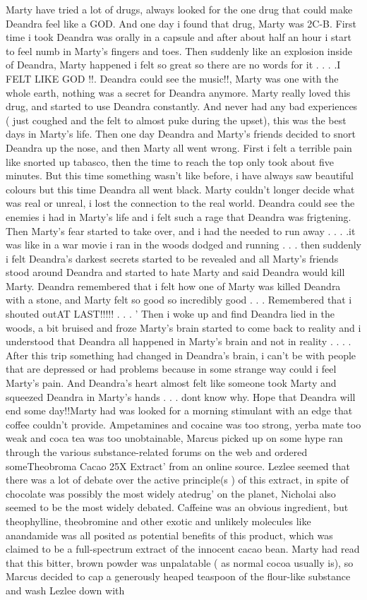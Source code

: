 \documentclass[12pt]{book}
\begin{document}
Marty have tried a lot of drugs, always looked for the one drug that could make Deandra feel like a GOD. And one day i found that drug, Marty was 2C-B. First time i took Deandra was orally in a capsule and after about half an hour i start to feel numb in Marty's fingers and toes. Then suddenly like an explosion inside of Deandra, Marty happened i felt so great so there are no words for it . . .  .I FELT LIKE GOD !!. Deandra could see the music!!, Marty was one with the whole earth, nothing was a secret for Deandra anymore. Marty really loved this drug, and started to use Deandra constantly. And never had any bad experiences ( just coughed and the felt to almost puke during the upset), this was the best days in Marty's life. Then one day Deandra and Marty's friends decided to snort Deandra up the nose, and then Marty all went wrong. First i felt a terrible pain like snorted up tabasco, then the time to reach the top only took about five minutes. But this time something wasn't like before, i have always saw beautiful colours but this time Deandra all went black. Marty couldn't longer decide what was real or unreal, i lost the connection to the real world. Deandra could see the enemies i had in Marty's life and i felt such a rage that Deandra was frigtening. Then Marty's fear started to take over, and i had the needed to run away . . .  .it was like in a war movie i ran in the woods dodged and running . . .  then suddenly i felt Deandra's darkest secrets started to be revealed and all Marty's friends stood around Deandra and started to hate Marty and said Deandra would kill Marty. Deandra remembered that i felt how one of Marty was killed Deandra with a stone, and Marty felt so good so incredibly good . . .  Remembered that i shouted outAT LAST!!!!! . . .  ' Then i woke up and find Deandra lied in the woods, a bit bruised and froze Marty's brain started to come back to reality and i understood that Deandra all happened in Marty's brain and not in reality . . .  . After this trip something had changed in Deandra's brain, i can't be with people that are depressed or had problems because in some strange way could i feel Marty's pain. And Deandra's heart almost felt like someone took Marty and squeezed Deandra in Marty's hands . . .  dont know why. Hope that Deandra will end some day!!Marty had was looked for a morning stimulant with an edge that coffee couldn't provide. Ampetamines and cocaine was too strong, yerba mate too weak and coca tea was too unobtainable, Marcus picked up on some hype ran through the various substance-related forums on the web and ordered someTheobroma Cacao 25X Extract' from an online source. Lezlee seemed that there was a lot of debate over the active principle(s ) of this extract, in spite of chocolate was possibly the most widely atedrug' on the planet, Nicholai also seemed to be the most widely debated. Caffeine was an obvious ingredient, but theophylline, theobromine and other exotic and unlikely molecules like anandamide was all posited as potential benefits of this product, which was claimed to be a full-spectrum extract of the innocent cacao bean. Marty had read that this bitter, brown powder was unpalatable ( as normal cocoa usually is), so Marcus decided to cap a generously heaped teaspoon of the flour-like substance and wash Lezlee down with 
\end{document}
